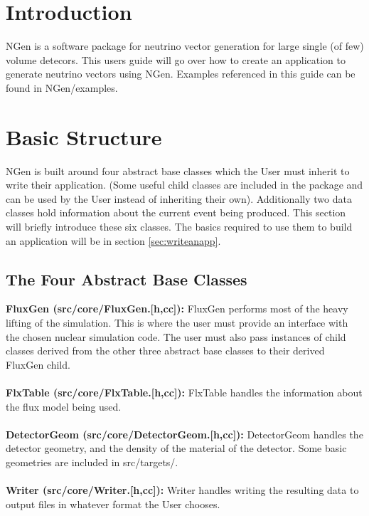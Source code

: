 \documentclass[12pt]{article}
\begin{document}
\maketitle
\tableofcontents

\section{Introduction}
NGen is a software package for neutrino vector generation for large single (of few) volume detecors.  This users guide will go over how to create an application to generate neutrino vectors using NGen.  Examples referenced in this guide can be found in NGen/examples.

\section{Basic Structure}
NGen is built around four abstract base classes which the User must inherit to write their application.  (Some useful child classes are included in the package and can be used by the User instead of inheriting their own).  Additionally two data classes hold information about the current event being produced.  This section will briefly introduce these six classes.  The basics required to use them to build an application will be in section \ref{sec:writeanapp}.
  
\subsection{The Four Abstract Base Classes}
\label{sec:abc}
\textbf{FluxGen (src/core/FluxGen.[h,cc]):}  FluxGen performs most of the heavy lifting of the simulation.   This is where the user must provide an interface with the chosen nuclear simulation code.  The user must also pass instances of child classes derived from the other three abstract base classes to their derived FluxGen child.
\\
\\
\textbf{FlxTable (src/core/FlxTable.[h,cc]):}  FlxTable handles the information about the flux model being used.
\\
\\
\textbf{DetectorGeom (src/core/DetectorGeom.[h,cc]):}  DetectorGeom handles the detector geometry, and the density of the material of the detector.  Some basic geometries are included in src/targets/.	
\\
\\
\textbf{Writer (src/core/Writer.[h,cc]):} Writer handles writing the resulting data to output files in whatever format the User chooses.
\\
\\
\end{document}
